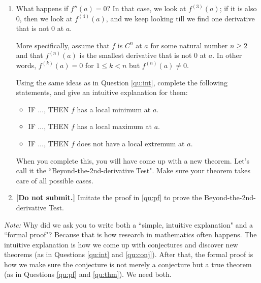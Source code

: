 \documentclass[12pt]{exam}
\begin{document}
\begin{enumerate}
\begin{enumerate}
			\emph{Note:}  There are many other ways to prove the 2nd Derivative Test, but we want you to do it specifically this way. It will help with the next questions.
	
		\item \label{qu:conj} What happens if $f''(a)=0$?     In that case, we look at $f^{(3)}(a)$;  if it is also $0$, then we look at $f^{(4)}(a)$, and we keep looking till we find one derivative that is not $0$ at $a$.   
		
		More specifically, assume that $f$ is $C^n$ at $a$ for some natural number $n \geq 2$ and that $f^{(n)}(a)$ is the smallest derivative  that is not $0$ at $a$.   In other words, $f^{(k)}(a) =0$ for $ 1 \leq k < n$ but $f^{(n)}(a) \neq 0$.
		
		Using the same ideas as in Question \ref{qu:int}, complete the following statements, and give an intuitive explanation for them:
			\begin{itemize}
				\item  IF ..., THEN $f$ has a local minimum at $a$.
				\item  IF ..., THEN $f$ has a local maximum at $a$.
				\item  IF ..., THEN $f$ does not have a local extremum at $a$.
			\end{itemize}
		When you complete this, you will have come up with a new theorem.  Let's call it the ``Beyond-the-2nd-derivative Test".   Make sure your theorem takes care of all possible cases.  
		\item \label{qu:thm}  {\bf [Do not submit.]}  Imitate the proof in \ref{qu:pf} to prove the Beyond-the-2nd-derivative Test.		
	\end{enumerate}

\emph{Note:}  Why did we ask you to write both a ``simple, intuitive explanation" and a ``formal proof"?  Because that is how research in mathematics often happens.  The intuitive explanation is how we come up with conjectures and discover new theorems (as in Questions \ref{qu:int} and \ref{qu:conj}).   After that, the formal proof is how we make sure the conjecture is not merely a conjecture but a true theorem (as in Questions \ref{qu:pf} and \ref{qu:thm}).   We need both.

\end{enumerate}
\end{document}

